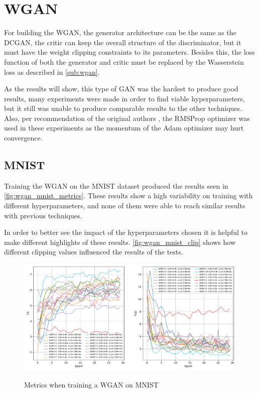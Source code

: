 \section{WGAN}
For building the \gls{WGAN}, the generator architecture can be the same as the \gls{DCGAN}, the critic can keep the overall structure of the discriminator, but it must have the weight clipping constraints to its parameters. Besides this, the loss function of both the generator and critic must be replaced by the Wasserstein loss as described in \autoref{sub:wgan}.

As the results will show, this type of \gls{GAN} was the hardest to produce good results, many experiments were made in order to find viable hyperparameters, but it still was unable to produce comparable results to the other techniques. Also, per recommendation of the original authors \cite{wasserstein2017}, the RMSProp optimizer was used in these experiments as the momentum of the Adam optimizer may hurt convergence.

\subsection{MNIST}
Training the \gls{WGAN} on the \gls{MNIST} dataset produced the results seen in \autoref{fig:wgan_mnist_metrics}. These results show a high variability on training with different hyperparameters, and none of them were able to reach similar results with previous techniques.

In order to better see the impact of the hyperparameters chosen it is helpful to make different highlights of these results. \autoref{fig:wgan_mnist_clip} shows how different clipping values influenced the results of the tests.

\begin{figure}[hbt]
    \centering
    \caption{Metrics when training a WGAN on MNIST}
    \includegraphics[width=\textwidth]{chapters/Experiments/WGAN/mnist_metrics.pdf}
    \label{fig:wgan_mnist_metrics}
\end{figure}

